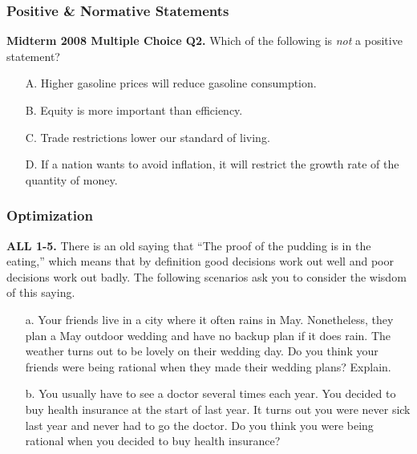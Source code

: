 \documentclass[12pt, xcolor=dvipsnames]{beamer}
\begin{document}
\begin{frame}
\frametitle{\bf Positive \& Normative Statements}
\noindent \small \textsf{\bfseries Midterm 2008 Multiple Choice Q2.}
Which of the following is {\it not} a positive statement?
\begin{enumerate}\itemsep-0.5ex
\item[A.] Higher gasoline prices will reduce gasoline consumption.
\item[B.] Equity is more important than efficiency.
\item[C.] Trade restrictions lower our standard of living.
\item[D.] If a nation wants to avoid inflation, it will restrict the growth rate of the quantity of money. 
\end{enumerate}
\end{frame}


\begin{frame}
\frametitle{\bf Optimization}
\small 
\noindent \textsf{\bfseries ALL 1-5.}
There is an old saying that ``The proof of the pudding is in the eating,'' which means that by definition good decisions work out well and poor decisions work out badly. The following scenarios ask you to consider the wisdom of this saying.
\begin{enumerate}
\item[a.] Your friends live in a city where it often rains in May. Nonetheless, they plan a May outdoor wedding and have no backup plan if it does rain. The weather turns out to be lovely on their wedding day. Do you think your friends were being rational when they made their wedding plans? Explain. 
\item[b.] You usually have to see a doctor several times each year. You decided to buy health insurance at the start of last year. It turns out you were never sick last year and never had to go the doctor. Do you think you were being rational when you decided to buy health insurance? 
\end{enumerate}
\end{frame}
\end{document}
